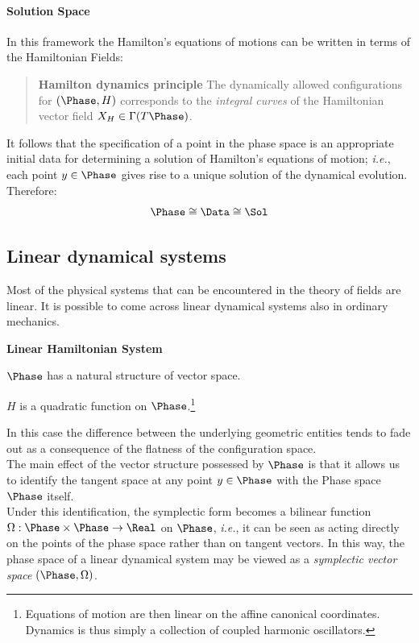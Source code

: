\documentclass[Main]{subfiles}
\begin{document}
	\paragraph{Solution Space}
	In this framework the Hamilton's equations of motions can be written in terms of the Hamiltonian Fields:
				\begin{quote}
				\textbf{Hamilton dynamics principle}
				The dynamically allowed configurations for $(\Phase,H)$ corresponds to the \emph{ integral curves}\cite{Abraham1978} of the Hamiltonian vector field $X_H \in \Gamma(T\Phase)$.
			\end{quote}
		It follows that the specification of a point in the phase space is an appropriate initial data for determining a solution of Hamilton's equations of motion; \textit{i.e.}, each point $y\in \Phase$  gives rise to a unique solution of the dynamical evolution.\\
		Therefore:
		\begin{equation}\label{Eq:PhaseDataSol}
			\Phase \cong \Data \cong \Sol
		\end{equation}
	
	\subsection{Linear dynamical systems}\label{Section:LinearClassicalSystem}
	Most of the physical systems that can be encountered in the theory of fields are linear.	
	It is possible to come across linear dynamical systems also in ordinary mechanics. 
		\begin{remark}
			\textbf{Linear Hamiltonian System}
			\begin{compactitemize}
				\item $\Phase$ has a natural structure of vector space.
				\item	$H$ is a quadratic function on $\Phase$.\footnote{Equations of motion are then linear on the affine canonical coordinates. Dynamics is thus simply a collection of coupled harmonic oscillators.}
			\end{compactitemize}
		\end{remark}
	\vspace{3mm}
	In this case the difference between the underlying geometric entities tends to fade out as a consequence of the flatness of the configuration space.
	\\
	The main effect of the vector structure possessed by $\Phase$  is that it allows us to identify the tangent space at any point $y \in \Phase$ with the Phase space $\Phase$ itself.
	\\
	Under this identification, the symplectic form becomes a bilinear function $\Omega: \Phase \times \Phase \rightarrow \Real$ on $\Phase$, \textit{i.e.}, it can be seen as acting directly on the points of the phase space rather than on tangent vectors.
	In this way, the phase space of a linear dynamical system may be viewed  as a \emph{symplectic vector space} $(\Phase, \Omega)$.
	
\end{document}
